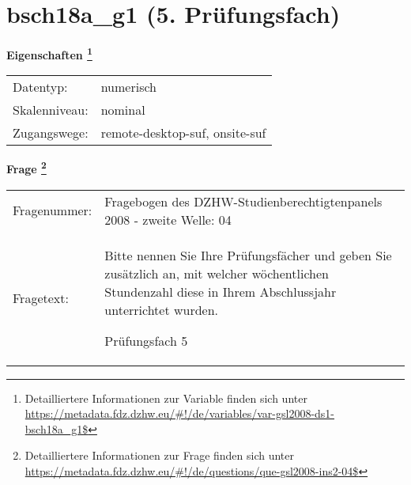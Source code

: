 
    \setcounter{footnote}{0}

    \vspace*{-1.8cm}
	\section{bsch18a\_g1 (5. Prüfungsfach)}
	\label{section:bsch18a_g1}



    \vspace*{0.5cm}
    \noindent\textbf{Eigenschaften
	\footnote{Detailliertere Informationen zur Variable finden sich unter
		\url{https://metadata.fdz.dzhw.eu/\#!/de/variables/var-gsl2008-ds1-bsch18a_g1$}}}\\
	\begin{tabularx}{\hsize}{@{}lX}
	Datentyp: & numerisch \\
	Skalenniveau: & nominal \\
	Zugangswege: &
	  remote-desktop-suf, 
	  onsite-suf
 \\
    \end{tabularx}



				\vspace*{0.5cm}
                \noindent\textbf{Frage
	                \footnote{Detailliertere Informationen zur Frage finden sich unter
		              \url{https://metadata.fdz.dzhw.eu/\#!/de/questions/que-gsl2008-ins2-04$}}}\\
				\begin{tabularx}{\hsize}{@{}lX}
					Fragenummer: &
					  Fragebogen des DZHW-Studienberechtigtenpanels 2008 - zweite Welle:
					  04
 \\
					Fragetext: & Bitte nennen Sie Ihre Prüfungsfächer und geben Sie zusätzlich an, mit welcher wöchentlichen Stundenzahl diese in Ihrem Abschlussjahr unterrichtet wurden.\par  Prüfungsfach 5 \\
				\end{tabularx}





